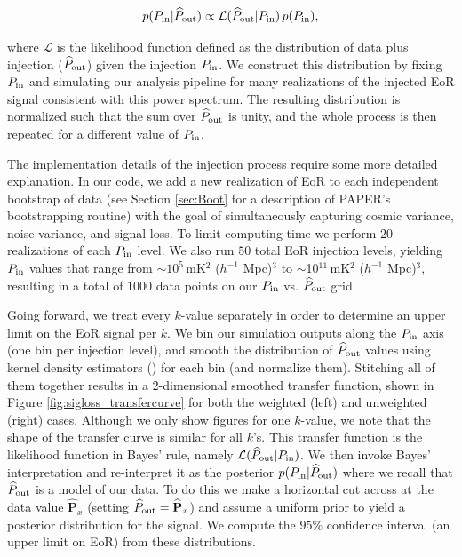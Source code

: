\documentclass[preprint2,numberedappendix,tighten]{aastex6}
\begin{document}
\begin{equation}
\label{eq:Bayes}
p(P_{\rm in} | \widehat{P}_{\rm out}) \propto {\mathcal{L} (  \widehat{P}_{\rm out} | P_{\rm in})}\,p(P_{\rm in}) ,
\end{equation}

\noindent where $\mathcal{L} $ is the likelihood function defined 
as the distribution of data plus injection ($\widehat{P}_{\rm out}$) given the injection $P_{\rm in}$.  We construct this distribution  
by fixing $P_{\rm in}$ and simulating our analysis pipeline for many realizations of the injected EoR signal 
consistent with this power spectrum. The resulting distribution is normalized such that the sum over $\widehat{P}_{\rm out}$ is unity, and the 
whole process is then repeated for a different value of $P_{\rm in}$. 


The implementation details of the injection process require some more detailed explanation. In our code, we add a new realization of EoR to each independent bootstrap of data (see Section \ref{sec:Boot} for a description of PAPER's bootstrapping routine) with the goal of simultaneously capturing cosmic variance, noise variance, and signal loss. To limit computing time we perform $20$ realizations of each $P_{\rm in}$ level. We also run $50$ total EoR injection levels, yielding $P_{\rm in}$ values that range from $\sim$$10^{5}$\,mK$^{2}$ ($h^{-1}$ Mpc)$^{3}$ to $\sim$10$^{11}$\,mK$^{2}$ ($h^{-1}$ Mpc)$^{3}$, resulting in a total of $1000$ data points on our $P_{\rm in}$ vs. $\widehat{P}_{\rm out}$ grid. 

Going forward, we treat every $k$-value separately in order to determine an upper limit on the EoR signal per $k$. We bin our simulation outputs along the $P_{\rm in}$ axis (one bin per injection level), and smooth the distribution of $\widehat{P}_{\rm out}$ values using kernel density estimators (\citealt{scott2008kernel}) for each bin (and normalize them). Stitching all of them together results in a 2-dimensional smoothed transfer function, shown in Figure \ref{fig:sigloss_transfercurve} for both the weighted (left) and unweighted (right) cases. Although we only show figures for one $k$-value, we note that 
the shape of the transfer curve is similar for all $k$'s. This transfer function is the likelihood function in Bayes' rule, namely $\mathcal{L} (  \widehat{P}_{\rm out} | P_{\rm in})$.  We then invoke Bayes' interpretation and re-interpret it as the posterior $p(P_{\rm in}|\widehat{P}_{\rm out})$ where we recall that $\widehat{P}_{\rm out}$ is a model of our data. To do this we make a horizontal cut across at the data value $\widehat{\textbf{P}}_{x}$ (setting $\widehat{P}_{\rm out} = \widehat{\textbf{P}}_{x}$) and assume a uniform prior to yield a posterior distribution for the signal. We compute the $95\%$ confidence interval (an upper limit on EoR) from these distributions.
\end{document}
